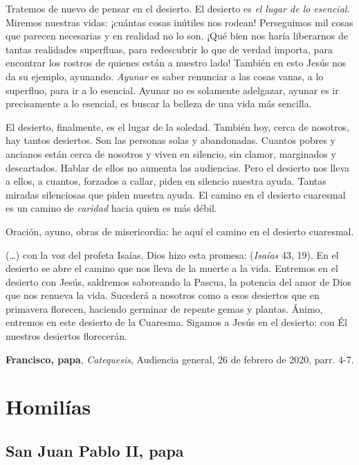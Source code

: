 \begin{patercite}
[\ldots] Tratemos de nuevo de pensar en el desierto. El desierto es \textit{el lugar de lo esencial}. Miremos nuestras vidas: ¡cuántas cosas inútiles nos rodean! Perseguimos mil cosas que parecen necesarias y en realidad no lo son. ¡Qué bien nos haría liberarnos de tantas realidades superfluas, para redescubrir lo que de verdad importa, para encontrar los rostros de quienes están a nuestro lado! También en esto Jesús nos da su ejemplo, ayunando. \textit{Ayunar} es saber renunciar a las cosas vanas, a lo superfluo, para ir a lo esencial. Ayunar no es solamente adelgazar, ayunar es ir precisamente a lo esencial, es buscar la belleza de una vida más sencilla.  

El desierto, finalmente, es el lugar de la soledad. También hoy, cerca de nosotros, hay tantos desiertos. Son las personas solas y abandonadas. Cuantos pobres y ancianos están cerca de nosotros y viven en silencio, sin clamor, marginados y descartados. Hablar de ellos no aumenta las audiencias. Pero el desierto nos lleva a ellos, a cuantos, forzados a callar, piden en silencio nuestra ayuda. Tantas miradas silenciosas que piden nuestra ayuda. El camino en el desierto cuaresmal es un camino de \textit{caridad} hacia quien es más débil.

Oración, ayuno, obras de misericordia: he aquí el camino en el desierto cuaresmal.

(\ldots) con la voz del profeta Isaías, Dios hizo esta promesa:  (\textit{Isaías} 43, 19). En el desierto se abre el camino que nos lleva de la muerte a la vida. Entremos en el desierto con Jesús, saldremos saboreando la Pascua, la potencia del amor de Dios que nos renueva la vida. Sucederá a nosotros como a esos desiertos que en primavera florecen, haciendo germinar de repente  gemas y plantas. Ánimo, entremos en este desierto de la Cuaresma. Sigamos a Jesús en el desierto: con Él nuestros desiertos florecerán.

\textbf{Francisco, papa}, \textit{Catequesis}, Audiencia general, 26 de febrero de 2020, parr. 4-7.
\end{patercite}

\newsection 
\section{Homilías}

\subsection{San Juan Pablo II, papa}

